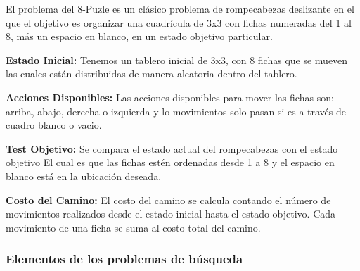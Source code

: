 El problema del 8-Puzle es un clásico problema de rompecabezas deslizante en el que el objetivo es 
organizar una cuadrícula de 3x3 con fichas numeradas del 1 al 8, más un espacio en blanco, en un 
estado objetivo particular.

\begin{myitemize}
    \item \textbf{Estado Inicial:} Tenemos un tablero inicial de 3x3, con 8 fichas que se mueven las 
    cuales están distribuidas de manera aleatoria dentro del tablero.

    \item \textbf{Acciones Disponibles:} Las acciones disponibles para mover las fichas son: arriba,
    abajo, derecha o izquierda y lo movimientos solo pasan si es a través de cuadro blanco o vacio.         
    
    \item \textbf{Test Objetivo:} Se compara el estado actual del rompecabezas con el estado objetivo 
    El cual es que las fichas estén ordenadas desde 1 a 8 y  el espacio en blanco está en la 
    ubicación deseada.
    
    \item \textbf{Costo del Camino:} El costo del camino se calcula contando el número de movimientos 
    realizados desde el estado inicial hasta el estado objetivo. Cada movimiento de una ficha se suma al 
    costo total del camino.
\end{myitemize}


\subsubsection*{Elementos de los problemas de búsqueda}

